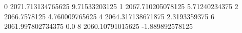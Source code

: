 0 2071.713134765625 9.71533203125
1 2067.710205078125 5.71240234375
2 2066.7578125 4.760009765625
4 2064.317138671875 2.3193359375
6 2061.997802734375 0.0
8 2060.10791015625 -1.889892578125
